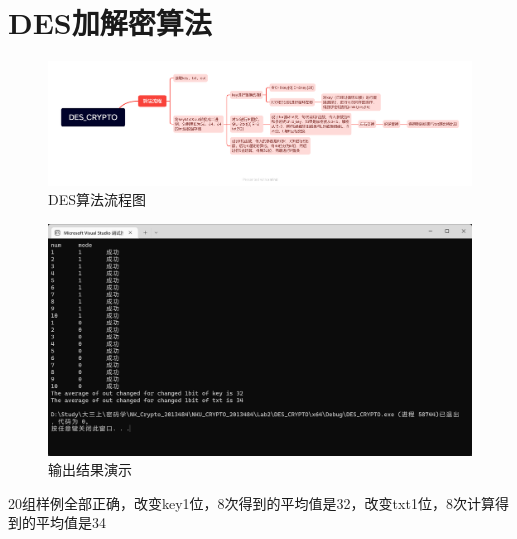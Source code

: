 \section{DES加解密算法}
\begin{figure}[thbp!]
	\centering
	\includegraphics[height=6 CM,width=18cm]{figure/001}
	\caption{DES算法流程图}
	\label{fig:DES算法流程图}
\end{figure}
\begin{figure}[thbp!]
	\centering
	\includegraphics[height=10 CM]{figure/002}
	\caption{输出结果演示}
	\label{fig:输出结果演示}
\end{figure}

20组样例全部正确，改变key1位，8次得到的平均值是32，改变txt1位，8次计算得到的平均值是34\\

